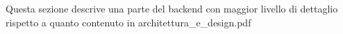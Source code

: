 
Questa sezione descrive una parte del backend con maggior livello di dettaglio rispetto a quanto contenuto in architettura\_e\_design.pdf